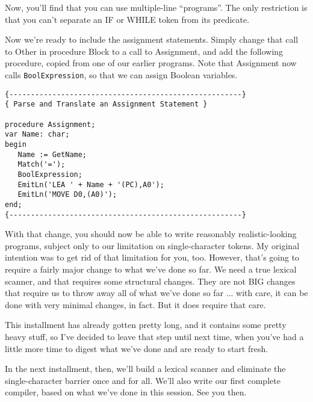 Now, you'll find that you  can use multiple-line ``programs''.  The only restriction is that you can't separate an IF or  WHILE token from its predicate.

Now we're ready to include  the  assignment  statements. Simply change  that  call  to  Other  in  procedure  Block  to a call to Assignment, and add  the  following procedure, copied from one of our  earlier  programs. Note   that   Assignment   now  calls {\tt BoolExpression}, so that we can assign Boolean variables.

\begin{verbatim}
{------------------------------------------------------}
{ Parse and Translate an Assignment Statement }

procedure Assignment;
var Name: char;
begin
   Name := GetName;
   Match('=');
   BoolExpression;
   EmitLn('LEA ' + Name + '(PC),A0');
   EmitLn('MOVE D0,(A0)');
end;
{------------------------------------------------------}
\end{verbatim}

With  that change, you should now be  able  to  write  reasonably realistic-looking  programs, subject  only  to our limitation on single-character tokens. My original intention was to get rid of that limitation for you, too. However, that's going to require a fairly major change to what we've  done  so  far. We need a true lexical scanner, and that requires some structural changes. They are not BIG changes that require us to  throw  away  all  of what we've done so far ... with care, it can be done with very minimal changes, in fact. But it does require that care.

This installment  has already gotten pretty long, and it contains some pretty heavy stuff, so I've decided to leave that step until next  time, when you've had a little more  time  to  digest  what we've done and are ready to start fresh.

In the next installment, then, we'll build a lexical scanner and eliminate the single-character  barrier  once and for all. We'll also write our first complete  compiler, based on what we've done in this session. See you then.
